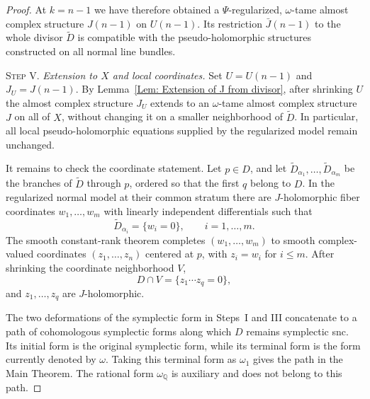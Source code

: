 \documentclass[11pt]{amsart}
\numberwithin{equation}{section}
\theoremstyle{plain}
\theoremstyle{definition}
\newcommand{\QQ}{\mathbb{Q}}
\begin{document}
\begin{proof}
At $k=n-1$ we have therefore obtained a $\Psi$-regularized,
$\omega$-tame almost complex structure $J(n-1)$ on $U(n-1)$. Its
restriction $\bar J(n-1)$ to the whole divisor $\widetilde D$ is compatible
with the pseudo-holomorphic structures constructed on all normal line bundles.

\medskip
\noindent\textsc{Step V}. \emph{Extension to $X$ and local coordinates.}
Set $U=U(n-1)$ and $J_U=J(n-1)$. By
Lemma~\ref{Lem: Extension of J from divisor}, after shrinking $U$ the almost
complex structure $J_U$ extends to an $\omega$-tame almost complex
structure $J$ on all of $X$, without changing it on a smaller neighborhood
of $\widetilde D$. In particular, all local pseudo-holomorphic equations
supplied by the regularized model remain unchanged.

It remains to check the coordinate statement. Let $p\in D$, and let
$\widetilde D_{\alpha_1},\ldots,\widetilde D_{\alpha_m}$ be the branches of
$\widetilde D$ through $p$, ordered so that the first $q$ belong to $D$. In
the regularized normal model at their common stratum there are
$J$-holomorphic fiber coordinates $w_1,\ldots,w_m$ with linearly independent
differentials such that
\[
\widetilde D_{\alpha_i}=\{w_i=0\},\qquad i=1,\ldots,m.
\]
The smooth constant-rank theorem completes $(w_1,\ldots,w_m)$ to smooth
complex-valued coordinates $(z_1,\ldots,z_n)$ centered at $p$, with
$z_i=w_i$ for $i\le m$. After shrinking the coordinate neighborhood $V$,
\[
D\cap V=\{z_1\cdots z_q=0\},
\]
and $z_1,\ldots,z_q$ are $J$-holomorphic.

The two deformations of the symplectic form in Steps~I and III concatenate to a
path of cohomologous symplectic forms along which $D$ remains symplectic snc.
Its initial form is the original symplectic form, while its terminal form is the
form currently denoted by $\omega$. Taking this terminal form as $\omega_1$
gives the path in the Main Theorem. The rational form $\omega_\QQ$ is auxiliary
and does not belong to this path.
\end{proof}

\end{document}
